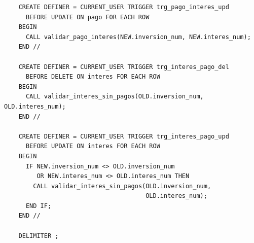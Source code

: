 \begin{verbatim}
	CREATE DEFINER = CURRENT_USER TRIGGER trg_pago_interes_upd
	  BEFORE UPDATE ON pago FOR EACH ROW
	BEGIN
	  CALL validar_pago_interes(NEW.inversion_num, NEW.interes_num);
	END //
	
	CREATE DEFINER = CURRENT_USER TRIGGER trg_interes_pago_del
	  BEFORE DELETE ON interes FOR EACH ROW
	BEGIN
	  CALL validar_interes_sin_pagos(OLD.inversion_num, OLD.interes_num);
	END //
	
	CREATE DEFINER = CURRENT_USER TRIGGER trg_interes_pago_upd
	  BEFORE UPDATE ON interes FOR EACH ROW
	BEGIN
	  IF NEW.inversion_num <> OLD.inversion_num
	     OR NEW.interes_num <> OLD.interes_num THEN
	    CALL validar_interes_sin_pagos(OLD.inversion_num,
	                                   OLD.interes_num);
	  END IF;
	END //
	
	DELIMITER ;
\end{verbatim}

